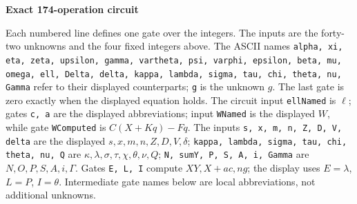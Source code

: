 \documentclass[10pt]{article}
\begin{document}
\clearpage
\begin{center}{\large\bfseries Exact 174-operation circuit}\end{center}
Each numbered line defines one gate over the integers. The inputs are the
forty-two unknowns and the four fixed integers above. The ASCII names
\texttt{alpha, xi, eta, zeta, upsilon, gamma, vartheta, psi, varphi, epsilon, beta, mu, omega, ell, Delta, delta, kappa, lambda, sigma, tau, chi, theta, nu, Gamma}
refer to their displayed counterparts; \texttt{g} is the unknown $g$. The last
gate is zero exactly when the displayed equation holds. The circuit input
\texttt{ellNamed} is $\ell$; gates \texttt{c, a} are the displayed abbreviations; input \texttt{WNamed} is the
displayed $W$, while gate \texttt{WComputed} is $C(X+Kq)-Fq$. The inputs
\texttt{s, x, m, n, Z, D, V, delta} are the displayed
$s,x,m,n,Z,D,V,\delta$; \texttt{kappa, lambda, sigma, tau, chi, theta, nu, Q}
are $\kappa,\lambda,\sigma,\tau,\chi,\theta,\nu,Q$; \texttt{N, sumY, P, S, A, i, Gamma}
are $N,O,P,S,A,i,\Gamma$. Gates \texttt{E, L, I} compute $XY,X+ac,ng$;
the display uses $E=\lambda$, $L=P$, $I=\theta$. Intermediate gate
names below are local abbreviations, not additional unknowns.
\end{document}
